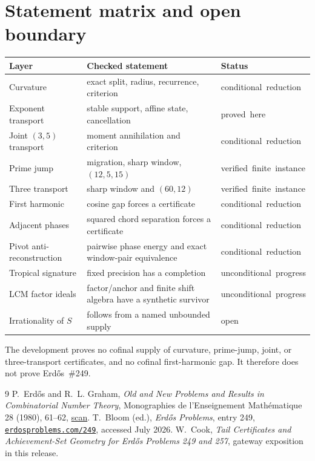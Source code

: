\documentclass[11pt]{article}
\theoremstyle{remark}\newtheorem*{remark}{Remark}
\begin{document}
\section{Statement matrix and open boundary}\label{sec:index}
\begin{center}\small
\begin{tabular}{@{}
>{\raggedright\arraybackslash}p{}
>{\raggedright\arraybackslash}p{}
>{\raggedright\arraybackslash}p{}@{}}
\toprule Layer & Checked statement & Status \\
\midrule
Curvature & exact split, radius, recurrence, criterion & \mbox{conditional reduction} \\
Exponent transport & stable support, affine state, cancellation & \mbox{proved here} \\
Joint $(3,5)$ transport & moment annihilation and criterion & \mbox{conditional reduction} \\
Prime jump & migration, sharp window, $(12,5,15)$ & \mbox{verified finite instance} \\
Three transport & sharp window and $(60,12)$ & \mbox{verified finite instance} \\
First harmonic & cosine gap forces a certificate & \mbox{conditional reduction} \\
Adjacent phases & squared chord separation forces a certificate & \mbox{conditional reduction} \\
Pivot anti-reconstruction & pairwise phase energy and exact window-pair equivalence & \mbox{conditional reduction} \\
Tropical signature & fixed precision has a completion & \mbox{unconditional progress} \\
LCM factor ideals & factor/anchor and finite shift algebra have a synthetic survivor & \mbox{unconditional progress} \\
Irrationality of $S$ & follows from a named unbounded supply & \mbox{open} \\
\bottomrule
\end{tabular}
\end{center}
The development proves no cofinal supply of curvature, prime-jump, joint, or
three-transport certificates, and no cofinal first-harmonic gap.  It therefore
does not prove Erd\H{o}s~\#249.

\begin{thebibliography}{9}
 P.~Erd\H{o}s and R.~L. Graham,
\emph{Old and New Problems and Results in Combinatorial Number Theory},
Monographies de l'Enseignement Math\'ematique 28 (1980), 61--62,
\href{https://mathweb.ucsd.edu/~ronspubs/80_11_number_theory.pdf}{scan}.
 T.~Bloom (ed.), \emph{Erd\H{o}s Problems}, entry 249,
\href{https://www.erdosproblems.com/249}{\texttt{erdosproblems.com/249}},
accessed July 2026.
 W.~Cook, \emph{Tail Certificates and Achievement-Set
Geometry for Erd\H{o}s Problems 249 and 257}, gateway exposition in this
release.
\end{thebibliography}
\end{document}
